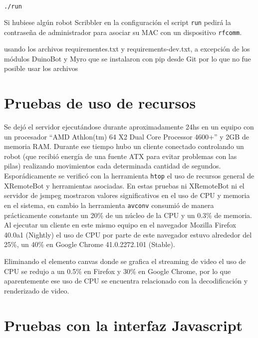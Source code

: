 \begin{lstlisting}[language=bash,
caption={Ejecutar el servidor y procesos asociados},
label=lst:ejecutar_xremotebot]
./run
\end{lstlisting}

Si hubiese algún robot Scribbler en la configuración el script
\texttt{run} pedirá la contraseña de administrador para asociar
su MAC con un dispositivo \texttt{rfcomm}.


usando los archivos requirementes.txt
y requirements-dev.txt, a excepción de los módulos DuinoBot y Myro que se
instalaron con pip desde Git por lo que no fue posible usar los archivos

\section{Pruebas de uso de recursos}
Se dejó el servidor ejecutándose durante aproximadamente 24hs en
un equipo con un procesador
``AMD Athlon(tm) 64 X2 Dual Core Processor 4600+'' y 2GB de memoria
RAM. Durante ese tiempo hubo un cliente conectado controlando
un robot (que recibió energía de una fuente ATX para evitar problemas
con las pilas) realizando movimientos cada determinada cantidad de
segundos. Esporádicamente se verificó con la herramienta
\texttt{htop} el uso de recursos general de XRemoteBot y herramientas
asociadas. En estas pruebas ni XRemoteBot ni el servidor de jsmpeg
mostraron valores significativos en el uso de CPU y memoria en
el sistema, en cambio la herramienta \texttt{avconv} consumió
de manera prácticamente constante un 20\% de un núcleo de la CPU
y un 0.3\% de memoria. Al ejecutar un cliente en este mismo
equipo en el navegador Mozilla Firefox 40.0a1 (Nightly)
el uso de CPU por parte de este navegador estuvo alrededor
del 25\%, un 40\% en Google Chrome 41.0.2272.101 (Stable).

Eliminando el elemento canvas donde se grafica el streaming de video
el uso de CPU se redujo a un 0.5\% en Firefox y 30\% en Google Chrome,
por lo que aparentemente ese uso de CPU se encuentra relacionado
con la decodificación y renderizado de video.

\section{Pruebas con la interfaz Javascript}

